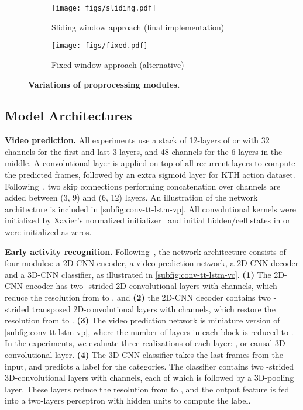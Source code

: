 \begin{figure*}[!htbp]
  \centering
    \begin{subfigure}[b]{0.48\textwidth}
  \centering 
      \texttt{[image: figs/sliding.pdf]}
      \caption{Sliding window approach (final implementation)}
      \label{subfig:sliding-window}
  \end{subfigure}
  \begin{subfigure}[b]{0.48\textwidth}
  \centering
       \texttt{[image: figs/fixed.pdf]}
      \caption{Fixed window approach (alternative)}
      \label{subfig:fixed-window}
  \end{subfigure}
  \caption{{\bf Variations of proprocessing modules.}}
   \label{fig:preprocessing}
\end{figure*}


\subsection{Model Architectures}
\label{app-sub:architecture}

\textbf{Video prediction.}
All experiments use a stack of 12-layers of {\ConvLSTM} or {\ConvTTLSTM} with 32 channels for the first and last 3 layers, and 48 channels for the 6 layers in the middle.
A convolutional layer is applied on top of all recurrent layers to compute the predicted frames, followed by an extra sigmoid layer for KTH action dataset.
Following~\citet{byeon2018contextvp}, two skip connections performing concatenation over channels are added between (3, 9) and (6, 12) layers.
An illustration of the network architecture is included in \autoref{subfig:conv-tt-lstm-vp}.
All convolutional kernels were initialized by Xavier's normalized initializer~\citep{glorot2010understanding} and initial hidden/cell states in {\ConvLSTM} or {\ConvTTLSTM} were initialized as zeros.

\textbf{Early activity recognition.}
Following~\citep{wang2018eidetic},
the network architecture consists of four modules: a 2D-CNN encoder, a video prediction network, a 2D-CNN decoder and a 3D-CNN classifier, as illustrated in \autoref{subfig:conv-tt-lstm-vc}. {\bf(1)} The 2D-CNN encoder has two -strided 2D-convolutional layers with  channels, which reduce the resolution from  to , and {\bf(2)} the 2D-CNN decoder contains two -strided transposed 2D-convolutional layers with  channels, which restore the resolution from  to . {\bf(3)} The video prediction network is miniature version of \autoref{subfig:conv-tt-lstm-vp}, where the number of layers in each block is reduced to . In the experiments, we evaluate three realizations of each layer: {\ConvLSTM}, {\ConvTTLSTM} or causal 3D-convolutional layer.
{\bf(4)} The 3D-CNN classifier takes the last  frames from the input, and predicts a label for the  categories. The classifier contains two -strided 3D-convolutional layers with  channels, each of which is followed by a 3D-pooling layer.
These layers reduce the resolution from  to , and the output feature is fed into a two-layers perceptron with  hidden units to compute the label.

